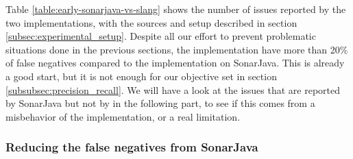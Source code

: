 Table \ref{table:early-sonarjava-vs-slang} shows the number of issues reported by the two implementations, with the sources and setup described in section \ref{subsec:experimental_setup}. 
Despite all our effort to prevent problematic situations done in the previous sections, the implementation have more than 20\% of false negatives compared to the implementation on SonarJava. 
This is already a good start, but it is not enough for our objective set in section \ref{subsubsec:precision_recall}.
We will have a look at the issues that are reported by SonarJava but not by \slang{} in the following part, to see if this comes from a misbehavior of the implementation, or a real limitation.

\subsubsection{Reducing the false negatives from SonarJava}
\label{subsec:reducing_false_positive_sonarjava}

